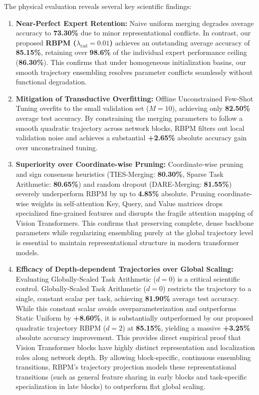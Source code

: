 The physical evaluation reveals several key scientific findings:
\begin{enumerate}
    \item \textbf{Near-Perfect Expert Retention:} Naive uniform merging degrades average accuracy to \textbf{73.30\%} due to minor representational conflicts. In contrast, our proposed \textbf{RBPM ($\lambda_{\text{rad}} = 0.01$)} achieves an outstanding average accuracy of \textbf{85.15\%}, retaining over \textbf{98.6\%} of the individual expert performance ceiling (\textbf{86.30\%}). This confirms that under homogeneous initialization basins, our smooth trajectory ensembling resolves parameter conflicts seamlessly without functional degradation.
    \item \textbf{Mitigation of Transductive Overfitting:} Offline Unconstrained Few-Shot Tuning overfits to the small validation set ($M = 10$), achieving only \textbf{82.50\%} average test accuracy. By constraining the merging parameters to follow a smooth quadratic trajectory across network blocks, RBPM filters out local validation noise and achieves a substantial \textbf{+2.65\%} absolute accuracy gain over unconstrained tuning.
    \item \textbf{Superiority over Coordinate-wise Pruning:} Coordinate-wise pruning and sign consensus heuristics (TIES-Merging: \textbf{80.30\%}, Sparse Task Arithmetic: \textbf{80.65\%}) and random dropout (DARE-Merging: \textbf{81.55\%}) severely underperform RBPM by up to \textbf{4.85\%} absolute. Pruning coordinate-wise weights in self-attention Key, Query, and Value matrices drops specialized fine-grained features and disrupts the fragile attention mapping of Vision Transformers. This confirms that preserving complete, dense backbone parameters while regularizing ensembling purely at the global trajectory level is essential to maintain representational structure in modern transformer models.
    \item \textbf{Efficacy of Depth-dependent Trajectories over Global Scaling:} Evaluating Globally-Scaled Task Arithmetic ($d=0$) is a critical scientific control. Globally-Scaled Task Arithmetic ($d=0$) restricts the trajectory to a single, constant scalar per task, achieving \textbf{81.90\%} average test accuracy. While this constant scalar avoids overparameterization and outperforms Static Uniform by \textbf{+8.60\%}, it is substantially outperformed by our proposed quadratic trajectory RBPM ($d=2$) at \textbf{85.15\%}, yielding a massive \textbf{+3.25\%} absolute accuracy improvement. This provides direct empirical proof that Vision Transformer blocks have highly distinct representation and localization roles along network depth. By allowing block-specific, continuous ensembling transitions, RBPM's trajectory projection models these representational transitions (such as general feature sharing in early blocks and task-specific specialization in late blocks) to outperform flat global scaling.

\end{enumerate}
